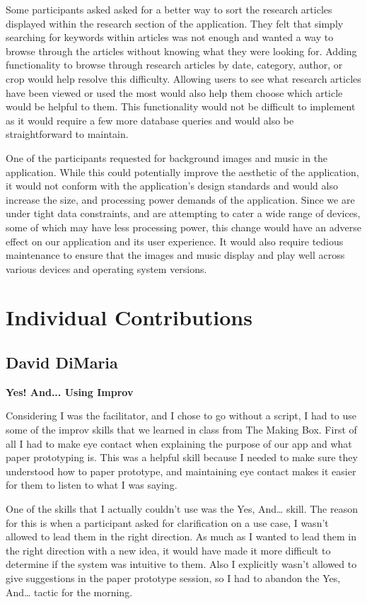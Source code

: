 \documentclass[12pt,letterpaper]{article}
\begin{document}
Some participants asked asked for a better way to sort the research articles displayed within the research section of the application. They felt that simply searching for keywords within articles was not enough and wanted a way to browse through the articles without knowing what they were looking for. Adding functionality to browse through research articles by date, category, author, or crop would help resolve this difficulty. Allowing users to see what research articles have been viewed or used the most would also help them choose which article would be helpful to them. This functionality would not be difficult to implement as it would require a few more database queries and would also be straightforward to maintain.\par
One of the participants requested for background images and music in the application. While this could potentially improve the aesthetic of the application, it would not conform with the application's design standards and would also increase the size, and processing power demands of the application. Since we are under tight data constraints, and are attempting to cater a wide range of devices, some of which may have less processing power, this change would have an adverse effect on our application and its user experience. It would also require tedious maintenance to ensure that the images and music display and play well across various devices and operating system versions. 

\clearpage
\section{Individual Contributions}
\subsection{David DiMaria}
\textbf{Yes! And... Using Improv}\par
Considering I was the facilitator, and I chose to go without a script, I had to use some of the improv skills that we learned in class from The Making Box. First of all I had to make eye contact when explaining the purpose of our app and what paper prototyping is. This was a helpful skill because I needed to make sure they understood how to paper prototype, and maintaining eye contact makes it easier for them to listen to what I was saying.\par
One of the skills that I actually couldn’t use was the Yes, And… skill. The reason for this is when a participant asked for clarification on a use case, I wasn’t allowed to lead them in the right direction. As much as I wanted to lead them in the right direction with a new idea, it would have made it more difficult to determine if the system was intuitive to them. Also I explicitly wasn’t allowed to give suggestions in the paper prototype session, so I had to abandon the Yes, And… tactic for the morning. 
\end{document}
